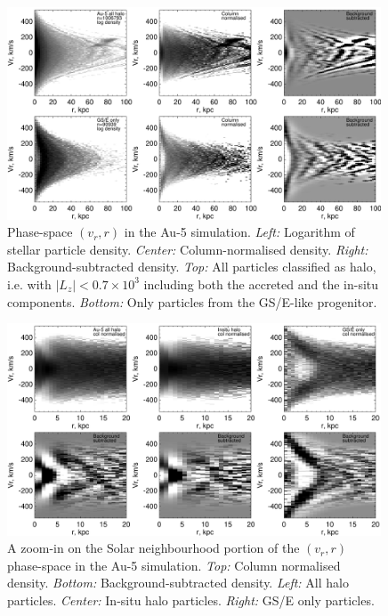 \documentclass[a4paper,useAMS,usenatbib]{mnras}
\begin{document}
%
\begin{figure}
  \centering
  \includegraphics[width=0.99\textwidth]{img/Auriga_5_large.pdf}
  \caption[]{Phase-space $(v_r,r)$ in the Au-5 simulation. {\it Left:} Logarithm of stellar particle density. {\it Center:} Column-normalised density. {\it Right:} Background-subtracted density. {\it Top:} All particles classified as halo, i.e. with $|L_z|<0.7\times10^3$ including both the accreted and the in-situ components. {\it Bottom:} Only particles from the GS/E-like progenitor.}
   \label{fig:Auriga_large}
\end{figure}
%

%
\begin{figure}
  \centering
  \includegraphics[width=0.99\textwidth]{img/Auriga_5_zoom.pdf}
  \caption[]{A zoom-in on the Solar neighbourhood portion of the $(v_r,r)$ phase-space in the Au-5 simulation. {\it Top:} Column normalised density. {\it Bottom:} Background-subtracted density. {\it Left:} All halo particles. {\it Center:} In-situ halo particles. {\it Right:} GS/E only particles.}
   \label{fig:Auriga_zoom}
\end{figure}
%
\end{document}
